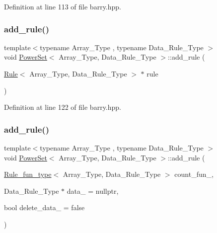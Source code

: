 Definition at line 113 of file barry.\+hpp.

\mbox{\label{classbarry_1_1_power_set_a6cb8fb8f09b4c190e2ac6c07daa1241e}} 
\subsubsection{\texorpdfstring{add\+\_\+rule()}{add\_rule()}\hspace{0.1cm}{\footnotesize\ttfamily [2/3]}}
{\footnotesize\ttfamily template$<$typename Array\+\_\+\+Type , typename Data\+\_\+\+Rule\+\_\+\+Type $>$ \\
void \hyperlink{classbarry_1_1_power_set}{Power\+Set}$<$ Array\+\_\+\+Type, Data\+\_\+\+Rule\+\_\+\+Type $>$\+::add\+\_\+rule (\begin{DoxyParamCaption}\item[{\hyperlink{classbarry_1_1_rule}{Rule}$<$ Array\+\_\+\+Type, Data\+\_\+\+Rule\+\_\+\+Type $>$ $\ast$}]{rule }\end{DoxyParamCaption})\hspace{0.3cm}{\ttfamily [inline]}}



Definition at line 122 of file barry.\+hpp.

\mbox{\label{classbarry_1_1_power_set_aae5eae12186fff037efa3884ac2b3dcc}} 
\subsubsection{\texorpdfstring{add\+\_\+rule()}{add\_rule()}\hspace{0.1cm}{\footnotesize\ttfamily [3/3]}}
{\footnotesize\ttfamily template$<$typename Array\+\_\+\+Type , typename Data\+\_\+\+Rule\+\_\+\+Type $>$ \\
void \hyperlink{classbarry_1_1_power_set}{Power\+Set}$<$ Array\+\_\+\+Type, Data\+\_\+\+Rule\+\_\+\+Type $>$\+::add\+\_\+rule (\begin{DoxyParamCaption}\item[{\hyperlink{namespacebarry_a3b914cb0dafdd5e5c19d142e8fa96c92}{Rule\+\_\+fun\+\_\+type}$<$ Array\+\_\+\+Type, Data\+\_\+\+Rule\+\_\+\+Type $>$}]{count\+\_\+fun\+\_\+,  }\item[{Data\+\_\+\+Rule\+\_\+\+Type $\ast$}]{data\+\_\+ = {\ttfamily nullptr},  }\item[{bool}]{delete\+\_\+data\+\_\+ = {\ttfamily false} }\end{DoxyParamCaption})\hspace{0.3cm}{\ttfamily [inline]}}




